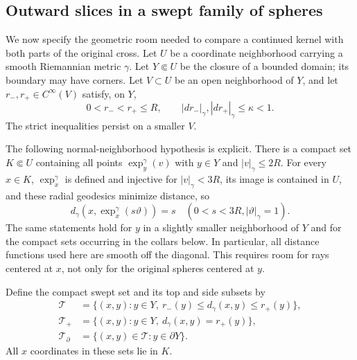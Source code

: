 \documentclass[11pt]{article}
\theoremstyle{definition}
\theoremstyle{remark}
\numberwithin{equation}{section}
\begin{document}
\subsection{Outward slices in a swept family of spheres}

We now specify the geometric room needed to compare a continued kernel
with both parts of the original cross. Let $U$ be a coordinate neighborhood
carrying a smooth Riemannian metric $\gamma$. Let $Y\Subset U$ be the
closure of a bounded domain; its boundary may have corners.
Let $V\subset U$ be an open neighborhood of $Y$, and let
$r_-,r_+\in C^\infty(V)$ satisfy, on $Y$,
\begin{equation}\label{cross-repairs:radii}
 0<r_-<r_+\le R,\qquad
 |dr_-|_\gamma,|dr_+|_\gamma\le\kappa<1.
\end{equation}
The strict inequalities persist on a smaller $V$.

The following normal-neighborhood hypothesis is explicit. There is a
compact set $K\Subset U$ containing all points
$\exp_y^\gamma(v)$ with $y\in Y$ and $|v|_\gamma\le2R$.
For every $x\in K$, $\exp_x^\gamma$ is defined and injective for
$|v|_\gamma<3R$, its image is contained in $U$, and these radial
geodesics minimize distance, so
\begin{equation}\label{cross-repairs:normal-room}
 d_\gamma(x,\exp_x^\gamma(s\vartheta))=s
 \quad(0<s<3R, |\vartheta|_\gamma=1).
\end{equation}
The same statements hold for $y$ in a slightly smaller neighborhood of
$Y$ and for the compact sets occurring in the collars below.
In particular, all distance functions used here are smooth off the
diagonal. This requires room for rays centered at $x$, not only for the
original spheres centered at $y$.

Define the compact swept set and its top and side subsets by
\begin{align*}
 \mathcal T&=\{(x,y):y\in Y,
                 \ r_-(y)\le d_\gamma(x,y)\le r_+(y)\},\\
 \mathcal T_+&=\{(x,y):y\in Y,
                         \ d_\gamma(x,y)=r_+(y)\},\\
 \mathcal T_{\partial}&=\{(x,y)\in\mathcal T:y\in\partial Y\}.
\end{align*}
All $x$ coordinates in these sets lie in $K$.
\end{document}

